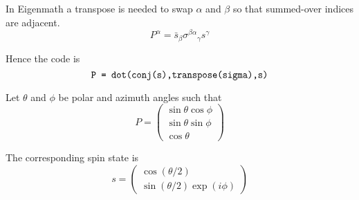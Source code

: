 \documentclass[12pt]{article}
\begin{document}
In Eigenmath a transpose is needed to swap $\alpha$ and $\beta$ so that summed-over indices are adjacent.
\begin{equation*}
P^\alpha=\bar s_\beta\sigma^{\beta\alpha}{}_\gamma s^\gamma
\end{equation*}

Hence the code is
\begin{equation*}
\text{\tt P = dot(conj(s),transpose(sigma),s)}
\end{equation*}

Let $\theta$ and $\phi$ be polar and azimuth angles such that
\begin{equation*}
P=\begin{pmatrix}\sin\theta\cos\phi\\\sin\theta\sin\phi\\\cos\theta\end{pmatrix}
\end{equation*}

The corresponding spin state is
\begin{equation*}
s=\begin{pmatrix}\cos(\theta/2)\\\sin(\theta/2)\exp(i\phi)\end{pmatrix}
\end{equation*}
\end{document}
